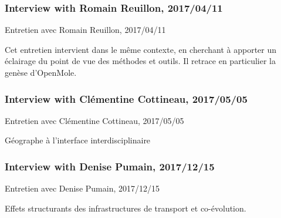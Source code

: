 \subsubsection{Interview with Romain Reuillon, 2017/04/11}{Entretien avec Romain Reuillon, 2017/04/11}

Cet entretien intervient dans le même contexte, en cherchant à apporter un éclairage du point de vue des méthodes et outils. Il retrace en particulier la genèse d'OpenMole.

\subsubsection{Interview with Clémentine Cottineau, 2017/05/05}{Entretien avec Clémentine Cottineau, 2017/05/05}

Géographe à l'interface interdisciplinaire




\subsubsection{Interview with Denise Pumain, 2017/12/15}{Entretien avec Denise Pumain, 2017/12/15}

Effets structurants des infrastructures de transport et co-évolution.











